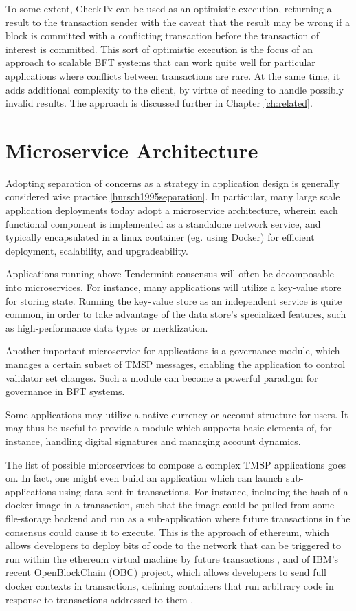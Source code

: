 To some extent, CheckTx can be used as an optimistic execution, 
returning a result to the transaction sender with the caveat that 
the result may be wrong if a block is committed with a conflicting transaction
before the transaction of interest is committed.
This sort of optimistic execution is the focus of an approach to scalable BFT systems 
that can work quite well for particular applications where conflicts between transactions are rare. 
At the same time, it adds additional complexity to the client, by virtue of needing to handle possibly invalid results.
The approach is discussed further in Chapter \ref{ch:related}.

\section{Microservice Architecture}

Adopting separation of concerns as a strategy in application design is generally considered wise practice \ref{hursch1995separation}.
In particular, many large scale application deployments today adopt a microservice architecture,
wherein each functional component is implemented as a standalone network service, 
and typically encapsulated in a linux container (eg. using Docker) for efficient deployment, scalability, and upgradeability.

Applications running above Tendermint consensus will often be decomposable into microservices.
For instance, many applications will utilize a key-value store for storing state.
Running the key-value store as an independent service is quite common, 
in order to take advantage of the data store's specialized features, such as high-performance data types or merklization.

Another important microservice for applications is a governance module, 
which manages a certain subset of TMSP messages, enabling the application to control validator set changes.
Such a module can become a powerful paradigm for governance in BFT systems.

Some applications may utilize a native currency or account structure for users.
It may thus be useful to provide a module which supports basic elements of, for instance,
handling digital signatures and managing account dynamics.

The list of possible microservices to compose a complex TMSP applications goes on. 
In fact, one might even build an application which can launch sub-applications using data sent in transactions.
For instance, including the hash of a docker image in a transaction,
such that the image could be pulled from some file-storage backend and run as a sub-application where
future transactions in the consensus could cause it to execute. 
This is the approach of ethereum, 
which allows developers to deploy bits of code to the network that can be triggered to run within the ethereum virtual machine by future transactions \cite{ethereum},
and of IBM's recent OpenBlockChain (OBC) project, which allows developers to send full docker contexts in transactions, 
defining containers that run arbitrary code in response to transactions addressed to them \cite{obc}.

